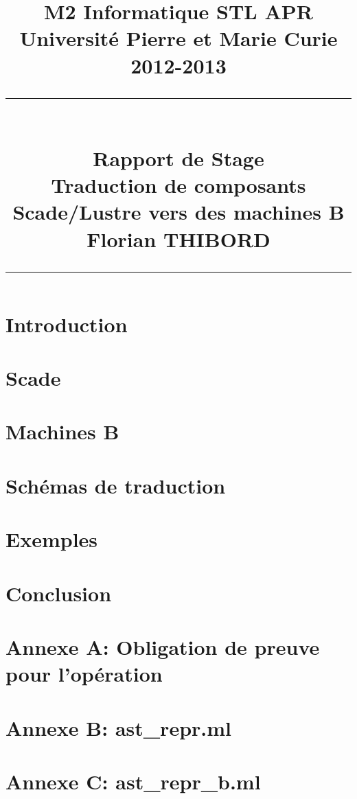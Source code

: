 \documentclass[11pt]{report}
\title{
	\normalsize{M2 Informatique STL APR\\
	Université Pierre et Marie Curie\\
	2012-2013}\\
	\vspace{3mm}
	\rule{\linewidth{}}{0.3mm}\\
	\Large{Rapport de Stage}\\
	\Large{Traduction de composants Scade/Lustre vers des machines B}\\
	\vspace{3mm}
	\normalsize{Florian THIBORD}
	\rule{\linewidth{}}{0.3mm}
}
\author{}
\date{}
\begin{document}
\maketitle
\clearpage

\tableofcontents 
\newpage

\chapter*{Introduction}


\chapter{Scade}


\chapter {Machines B}


\chapter{Schémas de traduction}


\chapter{Exemples}


\chapter*{Conclusion}


\nocite{*}



\begin{appendix}
\chapter{Annexe A: Obligation de preuve pour l'opération}


\chapter{Annexe B: ast\_repr.ml}


\chapter{Annexe C: ast\_repr\_b.ml}

\end{appendix}
\end{document}
